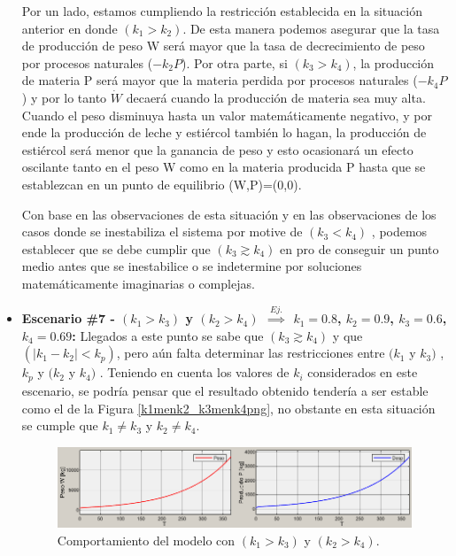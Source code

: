\begin{itemize}
    Por un lado, estamos cumpliendo la restricción establecida en la situación anterior en donde $(k_{1} > k_{2})$. De esta manera podemos asegurar que la tasa de producción de peso W será mayor que la tasa de decrecimiento de peso por procesos naturales ($-k_{2}P$). Por otra parte, si $(k_{3} > k_{4})$, la producción de materia P será mayor que la materia perdida por procesos naturales ($-k_{4}P$) y por lo tanto $\dot{W}$ decaerá cuando la producción de materia sea muy alta. Cuando el peso disminuya hasta un valor matemáticamente negativo, y por ende la producción de leche y estiércol también lo hagan, la producción de estiércol será menor que la ganancia de peso y esto ocasionará un efecto oscilante tanto en el peso W como en la materia producida P hasta que se establezcan en un punto de equilibrio (W,P)=(0,0).
    
    Con base en las observaciones de esta situación y en las observaciones de los casos donde se inestabiliza el sistema por motive de $(k_{3} < k_{4})$ , podemos establecer que se debe cumplir que $(k_{3} \gtrsim k_{4})$ en pro de conseguir un punto medio antes que se inestabilice o se indetermine por soluciones matemáticamente imaginarias o complejas.
        
    \item \textbf{Escenario \#7 - $(k_{1}>k_{3})$ y $(k_{2}>k_{4})$ $\overset{Ej.}{\implies}$ $k_{1}=0.8$, $k_{2}=0.9$, $k_{3}=0.6$, $k_{4}=0.69$:} Llegados a este punto se sabe que $(k_{3} \gtrsim k_{4})$ y que $(|k_{1} - k_{2}| < k_{p})$, pero aún falta determinar las restricciones entre $(k_{1}$ y $k_{3})$ ,$k_{p}$ y $(k_{2}$ y $k_{4})$ . Teniendo en cuenta los valores de $k_{i}$ considerados en este escenario, se podría pensar que el resultado obtenido tendería a ser estable como el de la Figura \ref{k1menk2_k3menk4png}, no obstante en esta situación se cumple que $k_{1} \neq k_{3}$ y $k_{2} \neq k_{4}$. 
    
            \begin{figure}[H]
        	 \centering
        	 \includegraphics[scale=0.75]{img/k1Mk3_k2Mk4.png}
        	 \caption{Comportamiento del modelo con $(k_{1}>k_{3})$ y $(k_{2}>k_{4})$. \label{k1Mk3_k2Mk4png}}
        \end{figure}


\end{itemize}
